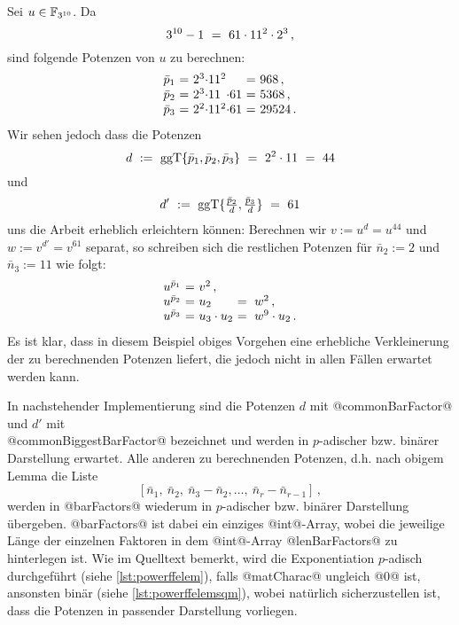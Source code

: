 \begin{beispiel}
  Sei $u \in \mathbb{F}_{3^{10}}$. Da
  \[ 3^{10}-1 \ =\  61 \cdot 11^{2} \cdot 2^{3} \,,\]
  sind folgende Potenzen von $u$ zu berechnen:
  \[ \begin{array}{l@{\ =\ }l@{}l@{}l@{\ =\ }l}
    \bar p_1 & 2^3 \cdot & 11^2 && 968\,, \\
    \bar p_2 & 2^3 \cdot & 11 & \cdot 61 & 5368\,,\\
    \bar p_3 & 2^2 \cdot & 11^2 & \cdot 61 & 29524\,.
    \end{array}\]
  Wir sehen jedoch dass die Potenzen
  \[ d \ :=\  \operatorname{ggT}\{ \bar p_1,\bar p_2,\bar p_3\} 
    \ =\  2^2\cdot 11 \ =\  44 \]
  und 
  \[ d' \ :=\  \operatorname{ggT}\{ \tfrac{\bar p_2}{d},\tfrac{\bar p_3}{d}\} \ =\  61\]
  uns die Arbeit erheblich erleichtern können:
  Berechnen wir $v := u^d = u^{44}$ und 
  $w := v^{d'} = v^{61}$ separat, so schreiben sich die restlichen Potenzen 
  für $\bar n_2 := 2$ und $\bar n_3 := 11$ wie folgt:
  \[ \begin{array}{l@{\ =\ }l@{}l}
    u^{\bar p_1} & v^2\,, \\
    u^{\bar p_2} & u_2 &\speq= w^2\,, \\
    u^{\bar p_3} & u_3\cdot u_2 &\speq= w^9 \cdot u_2 \,.
  \end{array} \]
  Es ist klar, dass in diesem Beispiel obiges Vorgehen eine erhebliche
  Verkleinerung der zu berechnenden Potenzen liefert, die jedoch nicht in allen
  Fällen erwartet werden kann.
\end{beispiel}


In nachstehender Implementierung sind die Potenzen $d$
mit @commonBarFactor@ und $d'$ mit \\
@commonBiggestBarFactor@ bezeichnet und
werden in $p$-adischer bzw. binärer Darstellung erwartet.  
Alle anderen zu berechnenden Potenzen, d.h. nach obigem Lemma die Liste
\[ [\bar n_1,\ \bar n_2,\ \bar n_3-\bar n_2,\ldots,\ 
  \bar n_r - \bar n_{r-1}]\,, \]
werden in 
@barFactors@ wiederum in $p$-adischer bzw. binärer Darstellung übergeben.
@barFactors@ ist dabei ein einziges @int@-Array,
wobei die jeweilige Länge der einzelnen Faktoren in dem @int@-Array
@lenBarFactors@ zu hinterlegen ist. Wie im Quelltext bemerkt, wird 
die Exponentiation $p$-adisch durchgeführt (siehe \autoref{lst:powerffelem}),
falls @matCharac@ ungleich @0@ ist, ansonsten binär 
(siehe \autoref{lst:powerffelemsqm}), wobei natürlich sicherzustellen ist, dass
die Potenzen in passender Darstellung vorliegen.

